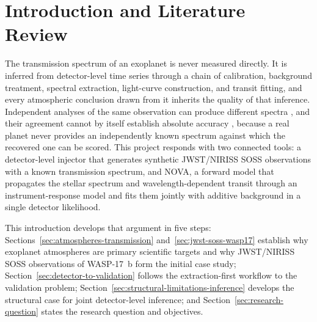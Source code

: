 \section{Introduction and Literature Review}
\label{sec:introduction}

The transmission spectrum of an exoplanet is never measured directly. It is
inferred from detector-level time series through a chain of calibration,
background treatment, spectral extraction, light-curve construction, and
transit fitting, and every atmospheric conclusion drawn from it inherits the
quality of that inference. Independent analyses of the same observation can
produce different spectra \citep{ConstantinouEtAl2023,KirkEtAl2024}, and their
agreement cannot by itself establish absolute accuracy \citep{LouieEtAl2025},
because a real planet never provides an independently known spectrum against
which the recovered one can be scored. This project responds with two
connected tools: a detector-level injector that generates synthetic
JWST/NIRISS SOSS observations with a known transmission spectrum, and NOVA, a
forward model that propagates the stellar spectrum and wavelength-dependent
transit through an instrument-response model and fits them jointly with
additive background in a single detector likelihood.

This introduction develops that argument in five steps:
Sections~\ref{sec:atmospheres-transmission}
and~\ref{sec:jwst-soss-wasp17} establish why exoplanet atmospheres are primary
scientific targets and why JWST/NIRISS SOSS observations of WASP-17~b form the
initial case study; Section~\ref{sec:detector-to-validation} follows the
extraction-first workflow to the validation problem;
Section~\ref{sec:structural-limitations-inference} develops the structural
case for joint detector-level inference; and
Section~\ref{sec:research-question} states the research question and
objectives.

